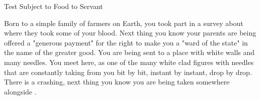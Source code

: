 \documentclass[char]{guildcamp4}
\begin{document}
\name{\cPlead{}}

Test Subject to Food to Servant

Born to a simple family of farmers on Earth, you took part in a survey about where they took some of your blood. Next thing you know your parents 
are being offered a "generous payment" for the right to make you a "ward of the state" in the name of the greater good. You are being sent to a place with white walls and many needles. You meet \cSpite{}  here, as one of the many white clad figures with needles that are constantly taking from you bit by bit, instant by instant, drop by drop. There is a crashing, next thing you know you are being taken somewhere alongside \cSpite{}.


\begin{itemz}[Goals]
	\item 
\end{itemz}

\begin{itemz}[Notes]
	\item 
\end{itemz}

\end{document}
